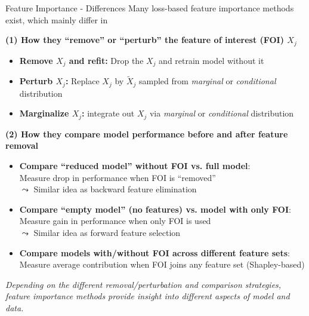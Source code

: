 \documentclass[11pt,compress,t,notes=noshow, aspectratio=169, xcolor=table]{beamer}
\begin{document}
\begin{frame}{Feature Importance - Differences }
Many loss-based feature importance methods exist, which mainly differ in

\medskip

\textbf{(1) How they ``remove'' or ``perturb'' the feature of interest (FOI) $X_j$}
\begin{itemize}
  \item \textbf{Remove $X_j$ and refit:} Drop the $X_j$ and retrain model without it %
  \item \textbf{Perturb $X_j$:} Replace $X_j$ by $\tilde X_j$ sampled from  
        \textit{marginal} or \textit{conditional} distribution %
  \item \textbf{Marginalize $X_j$:} integrate out $X_j$ via  
        \textit{marginal} or \textit{conditional} distribution %
\end{itemize}

\pause\medskip

\textbf{(2) How they compare model performance before and after feature removal}
\begin{itemize}
     \item \textbf{Compare ``reduced model'' without FOI vs. full model}: \\
     Measure drop in performance when FOI is ``removed'' \\
    $\leadsto$ Similar idea as backward feature elimination  %
    \item \textbf{Compare ``empty model'' (no features) vs. model with only FOI}: \\
    Measure gain in performance when only FOI is used \\
    $\leadsto$ Similar idea as forward feature selection %
    \item \textbf{Compare models with/without FOI across different feature sets}: \\
    Measure average contribution when FOI joins any feature set (Shapley-based) %
\end{itemize}

\pause \medskip

\textit{Depending on the different removal/perturbation and comparison strategies, feature importance methods provide insight into different aspects of model and data.}
\end{frame}
\end{document}
